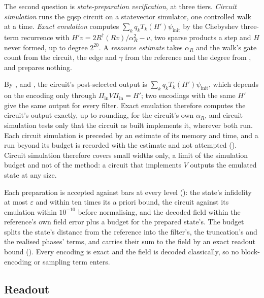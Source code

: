 The second question is \emph{state-preparation verification}, at three tiers. \emph{Circuit simulation} runs the \gls{gqsp} circuit on a statevector simulator, one controlled walk at a time. \emph{Exact emulation} computes $\sum_kq_kT_k(H')\psi_{\mathrm{init}}$ by the Chebyshev three-term recurrence with $H'v=2R^\dagger(Rv)/\alpha_R^2-v$, two sparse products a step and $H$ never formed, up to degree $2^{20}$. A \emph{resource estimate} takes $\alpha_R$ and the walk's gate count from the circuit, the edge and $\gamma$ from the reference and the degree from , and prepares nothing.

By ,  and , the circuit's post-selected output is $\sum_kq_kT_k(H')\psi_{\mathrm{init}}$, which depends on the encoding only through $\Pi_{\mathrm{in}}V\Pi_{\mathrm{in}}=H'$; two encodings with the same $H'$ give the same output for every filter. Exact emulation therefore computes the circuit's output exactly, up to rounding, for the circuit's own $\alpha_R$, and circuit simulation tests only that the circuit as built implements it, wherever both run. Each circuit simulation is preceded by an estimate of its memory and time, and a run beyond its budget is recorded with the estimate and not attempted (). Circuit simulation therefore covers small widths only, a limit of the simulation budget and not of the method: a circuit that implements $V$ outputs the emulated state at any size.

Each preparation is accepted against bars at every level (): the state's infidelity at most $\varepsilon$ and within ten times its a priori bound, the circuit against its emulation within $10^{-10}$ before normalising, and the decoded field within the reference's own field error plus a budget for the prepared state's. The budget splits the state's distance from the reference into the filter's, the truncation's and the realised phases' terms, and carries their sum to the field by an exact readout bound (). Every encoding is exact and the field is decoded classically, so no block-encoding or sampling term enters.

\subsection{Readout}
\label{sec:pipeline-readout}

